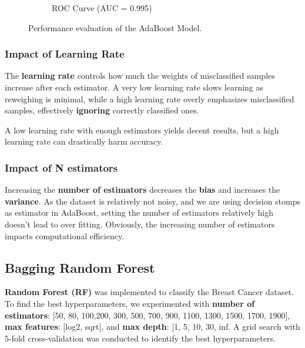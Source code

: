 \documentclass[12pt]{article}
\begin{document}
\begin{figure}[H]
\begin{subfigure}[b]{0.4\textwidth}
        \caption{ROC Curve (AUC = 0.995)}
        \label{fig:ada_roc}
    \end{subfigure}
    \caption{Performance evaluation of the AdaBoost Model.}
    \label{fig:ada_cm_roc}
\end{figure}

\vspace{-0.8cm}

\subsubsection*{Impact of Learning Rate}
The \textbf{learning rate} controls how much the weights of misclassified samples increase after each estimator. A very low learning rate slows learning as reweighing is minimal, while a high learning rate overly emphasizes misclassified samples, effectively \textbf{ignoring} correctly classified ones.
\par
A low learning rate with enough estimators yields decent results, but a high learning rate can drastically harm accuracy.
\subsubsection*{Impact of N estimators}
Increasing the \textbf{number of estimators} decreases the \textbf{bias} and increases the \textbf{variance}. As the dataset is relatively not noisy, and we are using decision stomps as estimator in AdaBoost, setting the number of estimators relatively high doesn't lead to over fitting. Obviously, the increasing number of estimators impacts computational efficiency.
\subsection{Bagging \textemdash Random Forest}
\textbf{Random Forest (RF)} was implemented to classify the Breast Cancer dataset. To find the best hyperparameters, we experimented with \textbf{number of estimators}: [50, 80, 100,200, 300, 500, 700, 900, 1100, 1300, 1500, 1700, 1900], \textbf{max features}: [log2, sqrt],  and \textbf{max depth}: [1, 5, 10, 30, inf. A grid search with 5-fold cross-validation was conducted to identify the best hyperparameters.\cite{breiman2001random}
\end{document}
